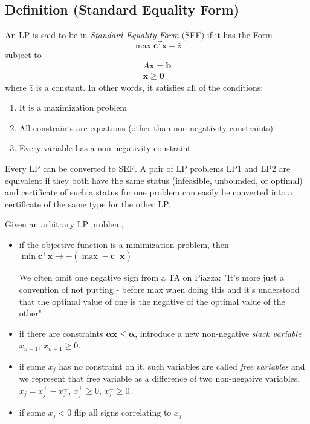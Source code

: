 \begin{defbox}
    \subsection{Definition (Standard Equality Form)}
    An LP is said to be in \emph{Standard Equality Form} (SEF) if it has the Form
    \[ \max \mathbf{c}^T \mathbf{x}+\bar{z}\]
    subject to
    \begin{align*}
        A \mathbf{x}=\mathbf{b}\\
        \mathbf{x}\ge \mathbf{0}
    \end{align*}
    where $ \bar{z} $ is a constant.
    In other words, it satisfies all of the conditions:
    \begin{enumerate}[(1)]
        \item It is a maximization problem
        \item All constraints are equations (other than non-negativity
        constraints)
        \item Every variable has a non-negativity constraint
    \end{enumerate}
\end{defbox}
Every LP can be converted to SEF. A pair of LP problems LP1 and LP2 are equivalent if they both have the
same status (infeasible, unbounded, or optimal) and certificate of such a status for one problem can easily
be converted into a certificate of the same type for the other LP.

Given an arbitrary LP problem, 
\begin{itemize}
    \item if the objective function is a minimization problem, then 
    $\min \mathbf{c}^\top \mathbf{x}\rightarrow -(\max -\mathbf{c}^\top \mathbf{x})$
        \begin{remark}
        We often omit one negative sign
        from a TA on Piazza: "It's more just a convention of not putting - 
        before max when doing this and it's understood that the 
        optimal value of one is the negative of the optimal value of the other"
        \end{remark} 
    \item if there are constraints $\mathbf{\alpha}\mathbf{x}\le \mathbf{\alpha}$, introduce a new
    non-negative \emph{slack variable} $x_{n+1}$, $x_{n+1}\ge 0$.
    \item if some $x_j$ has no constraint on it, such variables are called \emph{free variables} and
    we represent that free variable as a difference of two non-negative variables,
    $x_j=x_j^+-x_j^-$, $x_j^+\ge 0$, $x_j^-\ge 0$.
    \item if some $x_j<0$ flip all signs correlating to $x_j$
\end{itemize}


